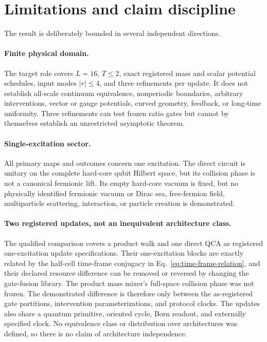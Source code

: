 \section{Limitations and claim discipline}
\label{sec:limitations}

The result is deliberately bounded in several independent directions.

\paragraph{Finite physical domain.}
The target role covers $L=16$, $T\le2$, exact registered mass and scalar
potential schedules, input modes $|r|\le4$, and three refinements per
update.  It does not establish all-scale continuum equivalence,
nonperiodic boundaries, arbitrary interventions, vector or gauge potentials,
curved geometry, feedback, or long-time uniformity.  Three refinements can
test frozen ratio gates but cannot by themselves establish an unrestricted
asymptotic theorem.

\paragraph{Single-excitation sector.}
All primary maps and outcomes concern one excitation.  The direct circuit is
unitary on the complete hard-core qubit Hilbert space, but its collision phase
is not a canonical fermionic lift.  Its empty hard-core vacuum is fixed, but
no physically identified fermionic vacuum or Dirac sea, free-fermion field,
multiparticle scattering, interaction, or particle creation is demonstrated.

\paragraph{Two registered updates, not an inequivalent architecture class.}
The qualified comparison covers a product walk and one direct QCA as registered
one-excitation update specifications.  Their
one-excitation blocks are exactly related by the half-cell time-frame conjugacy
in Eq.~\eqref{eq:time-frame-relation}, and their declared resource difference
can be removed or reversed by changing the gate-fusion library.  The product
mass mixer's full-space collision phase was not frozen.  The demonstrated
difference is therefore only between the as-registered gate partitions,
intervention parameterizations, and protocol clocks.  The updates also share a
quantum primitive, oriented cycle, Born readout, and externally specified
clock.  No equivalence class or distribution over architectures was defined,
so there is no claim of architecture independence.

